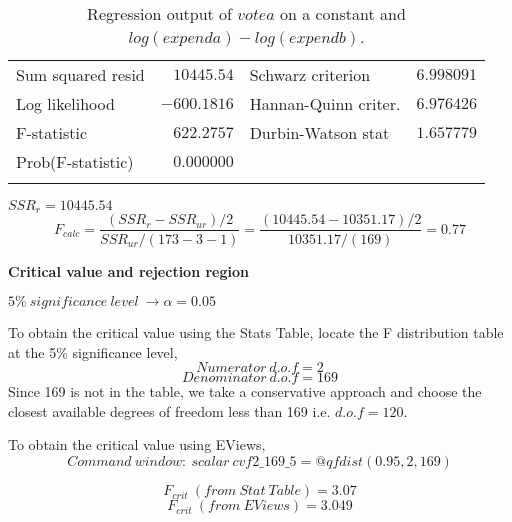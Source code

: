\documentclass[12pt]{report}
\begin{document}
\begin{table}[H]
\begin{tabular}{lrrrr}
		\multicolumn{1}{l}{Sum squared resid}&\multicolumn{1}{r}{$10445.54$}&\multicolumn{2}{l}{Schwarz criterion}&\multicolumn{1}{r}{$6.998091$}\\
		\multicolumn{1}{l}{Log likelihood}&\multicolumn{1}{r}{$-600.1816$}&\multicolumn{2}{l}{Hannan-Quinn criter.}&\multicolumn{1}{r}{$6.976426$}\\
		\multicolumn{1}{l}{F-statistic}&\multicolumn{1}{r}{$622.2757$}&\multicolumn{2}{l}{Durbin-Watson stat}&\multicolumn{1}{r}{$1.657779$}\\
		\multicolumn{1}{l}{Prob(F-statistic)}&\multicolumn{1}{r}{$0.000000$}&\multicolumn{1}{c}{}&\multicolumn{1}{c}{}&\multicolumn{1}{c}{}\\
		[4.5pt] \hline \\ [-4.5pt]
	\end{tabular}
	\caption{Regression output of $votea$ on a constant and $log(expenda)-log(expendb)$.}
\end{table}
\vspace{-\baselineskip}
\centering $SSR_r = 10445.54$
$$F_{calc} = \dfrac{(SSR_r - SSR_{ur})/2}{SSR_{ur}/(173-3-1)} = \dfrac{(10445.54-10351.17)/2}{10351.17/(169)} = 0.77 $$

\justify \noindent \textbf{Critical value and rejection region}

\noindent $5\%\ significance\ level\ \to \alpha = 0.05$

\noindent To obtain the critical value using the Stats Table, locate the F distribution table at the 5\% significance level,
$$Numerator\ d.o.f = 2$$
$$Denominator\ d.o.f = 169$$
\noindent Since 169 is not in the table, we take a conservative approach and choose the closest available degrees of freedom less than 169 i.e. $d.o.f=120$. 
\begin{figure}[H]
	\centering
\end{figure}
\vspace{-\baselineskip}
\noindent To obtain the critical value using EViews,
$$Command\ window:\ scalar\ cvf2\_169\_5=@qfdist(0.95,2,169)$$
\begin{figure}[H]
	\centering
\end{figure}
\vspace{-\baselineskip}
\begin{figure}[H]
	\centering
\end{figure}
\vspace{-\baselineskip}
\begin{figure}[H]
	\centering
\end{figure}
\vspace{-\baselineskip}
$$F_{crit}\ (from\ Stat\ Table) = 3.07$$
$$F_{crit}\ (from\ EViews) = 3.049$$
\end{document}
